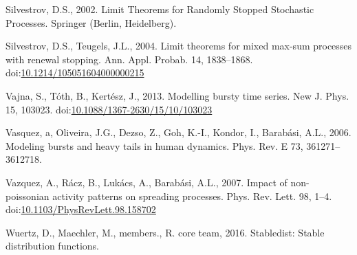 \documentclass[]{elsarticle} %
\begin{document}
\leavevmode\hypertarget{ref-Silvestrov2002a}{}%
Silvestrov, D.S., 2002. Limit Theorems for Randomly Stopped Stochastic
Processes. Springer (Berlin, Heidelberg).

\leavevmode\hypertarget{ref-ST04}{}%
Silvestrov, D.S., Teugels, J.L., 2004. Limit theorems for mixed max-sum
processes with renewal stopping. Ann. Appl. Probab. 14, 1838--1868.
doi:\href{https://doi.org/10.1214/105051604000000215}{10.1214/105051604000000215}

\leavevmode\hypertarget{ref-Vajna2013}{}%
Vajna, S., Tóth, B., Kertész, J., 2013. Modelling bursty time series.
New J. Phys. 15, 103023.
doi:\href{https://doi.org/10.1088/1367-2630/15/10/103023}{10.1088/1367-2630/15/10/103023}

\leavevmode\hypertarget{ref-Vasquez2006}{}%
Vasquez, a, Oliveira, J.G., Dezso, Z., Goh, K.-I., Kondor, I., Barabási,
A.L., 2006. Modeling bursts and heavy tails in human dynamics. Phys.
Rev. E 73, 361271--3612718.

\leavevmode\hypertarget{ref-Vazquez2007}{}%
Vazquez, A., Rácz, B., Lukács, A., Barabási, A.L., 2007. Impact of
non-poissonian activity patterns on spreading processes. Phys. Rev.
Lett. 98, 1--4.
doi:\href{https://doi.org/10.1103/PhysRevLett.98.158702}{10.1103/PhysRevLett.98.158702}

\leavevmode\hypertarget{ref-stabledist}{}%
Wuertz, D., Maechler, M., members., R. core team, 2016. Stabledist:
Stable distribution functions.
\end{document}
